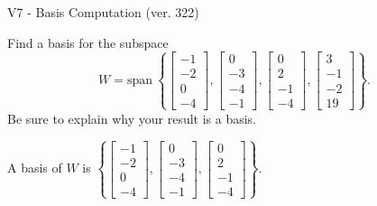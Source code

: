 \begin{exercise}
  \begin{exerciseTitle}V7 - Basis Computation (ver. 322)\end{exerciseTitle}
  \begin{exerciseStatement}
    Find a basis for the subspace 
\[W=\mathrm{span}\ \left\{\left[\begin{array}{r}
-1 \\
-2 \\
0 \\
-4
\end{array}\right] , \left[\begin{array}{r}
0 \\
-3 \\
-4 \\
-1
\end{array}\right] , \left[\begin{array}{r}
0 \\
2 \\
-1 \\
-4
\end{array}\right] , \left[\begin{array}{r}
3 \\
-1 \\
-2 \\
19
\end{array}\right]\right\}.\]
 Be sure to explain why your result is a basis.


  \end{exerciseStatement}
  \begin{exerciseAnswer}
   A basis of \(W\) is  \(\left\{\left[\begin{array}{r}
-1 \\
-2 \\
0 \\
-4
\end{array}\right] , \left[\begin{array}{r}
0 \\
-3 \\
-4 \\
-1
\end{array}\right] , \left[\begin{array}{r}
0 \\
2 \\
-1 \\
-4
\end{array}\right]\right\}\).
  


  \end{exerciseAnswer}
\end{exercise}